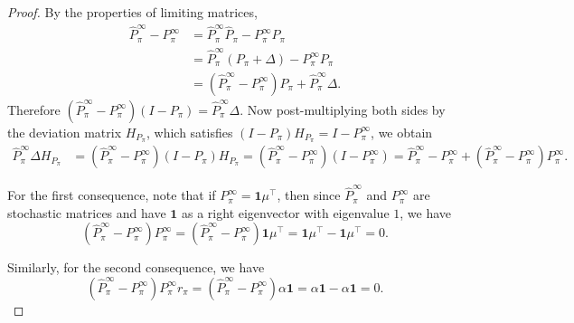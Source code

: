 \documentclass{article}
\theoremstyle{plain}
\theoremstyle{plain}
\theoremstyle{remark}
\theoremstyle{plain}
\theoremstyle{plain}
\newcommand{\Phat}{\widehat{P}}
\newcommand{\one}{\mathbf{1}}
\begin{document}
\begin{proof}
By the properties of limiting matrices,
    \begin{align*}
        \Phat_\pi^\infty - P_\pi^\infty &= \Phat_\pi^\infty \Phat_\pi - P_\pi^\infty P_\pi \\
        &= \Phat_\pi^\infty (P_\pi + \Delta) - P_\pi^\infty P_\pi \\
        &= (\Phat_\pi^\infty - P_\pi^\infty ) P_\pi + \Phat_\pi^\infty \Delta .
    \end{align*}
    Therefore $(\Phat_\pi^\infty - P_\pi^\infty)(I - P_\pi) = \Phat_\pi^\infty \Delta$. Now post-multiplying both sides by the deviation matrix $H_{P_\pi}$, which satisfies $(I - P_\pi) H_{P_\pi} = I - P_\pi^\infty$, we obtain
    \begin{align*}
        \Phat_\pi^\infty \Delta H_{P_\pi} &= (\Phat_\pi^\infty - P_\pi^\infty)(I - P_\pi) H_{P_\pi} = (\Phat_\pi^\infty - P_\pi^\infty)(I - P^\infty_\pi) = \Phat_\pi^\infty - P_\pi^\infty + (\Phat_\pi^\infty - P_\pi^\infty)P^\infty_\pi.
    \end{align*}

    For the first consequence, note that if $P^\infty_\pi = \one \mu^\top$, then since $\Phat_\pi^\infty$ and $P_\pi^\infty$ are stochastic matrices and have $\one$ as a right eigenvector with eigenvalue $1$, we have
    \[(\Phat_\pi^\infty - P_\pi^\infty)P^\infty_\pi = (\Phat_\pi^\infty - P_\pi^\infty) \one \mu^\top = \one \mu^\top - \one \mu^\top = 0.\]

    Similarly, for the second consequence, we have
    \[(\Phat_\pi^\infty - P_\pi^\infty)P^\infty_\pi r_\pi = (\Phat_\pi^\infty - P_\pi^\infty) \alpha \one  = \alpha \one  - \alpha \one = 0.\]
\end{proof}
\end{document}
